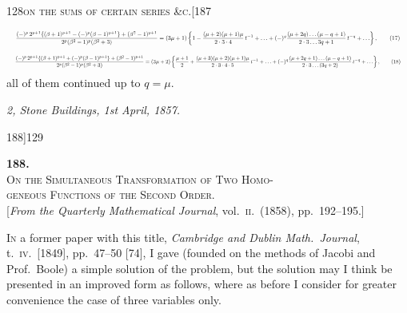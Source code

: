 \documentclass[11pt]{article}
\begin{document}
\begin{center}\small\textsc{128}\hfill\textsc{on the sums of certain series \&c.}\hfill[187\end{center}

\[ \resizebox{\textwidth}{!}{$\displaystyle
\frac{(-)^{p}\, 2^{p+1}\{(\beta+1)^{p+1} - (-)^{p}(\beta-1)^{p+1}\} + (\beta^{2}-1)^{p+1}}{2^{p}(\beta^{2}-1)^{p}(\beta^{2}+3)} = (3\mu+1)\left\{1 - \frac{(\mu+2)(\mu+1)\mu}{2\cdot 3\cdot 4}\,t^{-1} + \ldots + (-)^{q}\frac{(\mu+2q)\ldots(\mu-q+1)}{2\cdot 3\ldots 3q+1}\,t^{-q} + \ldots\right\}, \qquad (17)
$} \]
\[ \resizebox{\textwidth}{!}{$\displaystyle
\frac{(-)^{p}\, 2^{p+1}\{(\beta+1)^{p+1} + (-)^{p}(\beta-1)^{p+1}\} + (\beta^{2}-1)^{p+1}}{2^{p}(\beta^{2}-1)^{p}(\beta^{2}+3)} = (3\mu+2)\left\{\frac{\mu+1}{2} + \frac{(\mu+3)(\mu+2)(\mu+1)\mu}{2\cdot 3\cdot 4\cdot 5}\,t^{-1} + \ldots + (-)^{q}\frac{(\mu+2q+1)\ldots(\mu-q+1)}{2\cdot 3\ldots(3q+2)}\,t^{-q} + \ldots\right\}, \qquad (18)
$} \]
all of them continued up to $q = \mu$.

\medskip
\textit{2, Stone Buildings, 1st April, 1857.}

\bigskip
\begin{center}\small\textsc{188]}\hfill\textsc{129}\end{center}

\begin{center}
\textbf{188.}\\[0.5em]
\textsc{On the Simultaneous Transformation of Two Homo-\\geneous Functions of the Second Order.}\\[0.4em]
\small [\textit{From the Quarterly Mathematical Journal}, vol.\ \textsc{ii}.\ (1858), pp.\ 192--195.]
\end{center}

\medskip
\noindent \textsc{In} a former paper with this title, \textit{Cambridge and Dublin Math.\ Journal}, t.\ \textsc{iv}.\
[1849], pp.\ 47--50 [74], I gave (founded on the methods of Jacobi and Prof.\ Boole)
a simple solution of the problem, but the solution may I think be presented in an
improved form as follows, where as before I consider for greater convenience the case
of three variables only.
\end{document}
